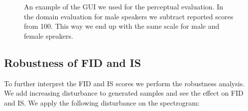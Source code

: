 \begin{figure}
    \centering
    \hspace{10mm}
    \caption[Perceptual evaluation interface]{An example of the GUI we used for the perceptual evaluation. In the domain evaluation for male speakers we subtract reported scores from 100. This way we end up with the same scale for male and female speakers.}
    \label{fig:perceptual_test}
\end{figure}{}

\subsection{Robustness of FID and IS}
\label{subsec:robust_scores}
To further interpret the FID and IS scores we perform the robustness analysis. We add increasing disturbance to generated samples and see the effect on FID and IS. We apply the following disturbance on the spectrogram:

